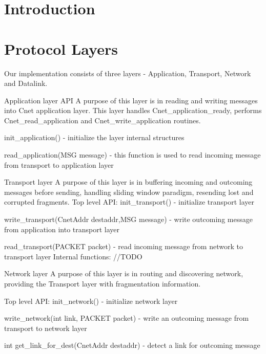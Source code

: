 \documentclass{article}
\begin{document}
\title{}
\author{Group 7: \\ Sanjar Karaev, Igor Stassiy, Kirill Afanasev}
\date{\today}
\maketitle

\section{Introduction}

\section{Protocol Layers}
Our implementation consists of three layers - Application, Transport, Network
and Datalink. 

	Application layer API
		A purpose of this layer is in reading and writing messages into Cnet
		application layer. This layer handles Cnet_application_ready, performs
		Cnet_read_application and Cnet_write_application routines.
	
		init_application() - initialize the layer internal structures
		
		read_application(MSG message) - this function is used to read incoming message
		from transport to application layer
		
		
		
	Transport layer
		A purpose of this layer is in buffering incoming and outcoming messages
		before sending, handling sliding window paradigm, resending lost and corrupted
		fragments.
		Top level API:
			init_transport() - initialize transport layer
		
			write_transport(CnetAddr destaddr,MSG message) - write outcoming message from
			application into transport layer
		
			read_transport(PACKET packet) - read incoming message from network to
			transport layer
		Internal functions:
			//TODO
		
		
	Network layer
		A purpose of this layer is in routing and discovering network, providing the
		Transport layer with fragmentation information.
		
		Top level API:
			init_network() - initialize network layer
		
			write_network(int link, PACKET packet) - write an outcoming message from
			transport to network layer
		
			int get_link_for_dest(CnetAddr destaddr) - detect a link for outcoming
			message
		
\end{document}

